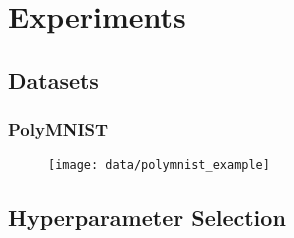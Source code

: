 \section{Experiments}

\subsection{Datasets}

\subsubsection{PolyMNIST} \label{polymnist}
\begin{figure}[h!]
    \centering
    \texttt{[image: data/polymnist\_example]}
\end{figure}

\subsection{Hyperparameter Selection}